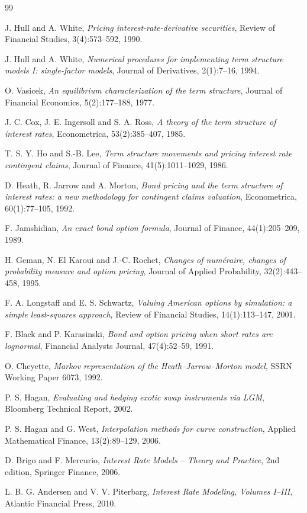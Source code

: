 \documentclass[11pt,a4paper]{article}
\theoremstyle{plain}
\theoremstyle{definition}
\begin{document}
\begin{thebibliography}{99}

J. Hull and A. White,
\textit{Pricing interest-rate-derivative securities},
Review of Financial Studies, 3(4):573--592, 1990.

J. Hull and A. White,
\textit{Numerical procedures for implementing term structure models I: single-factor models},
Journal of Derivatives, 2(1):7--16, 1994.

O. Vasicek,
\textit{An equilibrium characterization of the term structure},
Journal of Financial Economics, 5(2):177--188, 1977.

J. C. Cox, J. E. Ingersoll and S. A. Ross,
\textit{A theory of the term structure of interest rates},
Econometrica, 53(2):385--407, 1985.

T. S. Y. Ho and S.-B. Lee,
\textit{Term structure movements and pricing interest rate contingent claims},
Journal of Finance, 41(5):1011--1029, 1986.

D. Heath, R. Jarrow and A. Morton,
\textit{Bond pricing and the term structure of interest rates: a new methodology for contingent claims valuation},
Econometrica, 60(1):77--105, 1992.

F. Jamshidian,
\textit{An exact bond option formula},
Journal of Finance, 44(1):205--209, 1989.

H. Geman, N. El Karoui and J.-C. Rochet,
\textit{Changes of numéraire, changes of probability measure and option pricing},
Journal of Applied Probability, 32(2):443--458, 1995.

F. A. Longstaff and E. S. Schwartz,
\textit{Valuing American options by simulation: a simple least-squares approach},
Review of Financial Studies, 14(1):113--147, 2001.

F. Black and P. Karasinski,
\textit{Bond and option pricing when short rates are lognormal},
Financial Analysts Journal, 47(4):52--59, 1991.

O. Cheyette,
\textit{Markov representation of the Heath--Jarrow--Morton model},
SSRN Working Paper 6073, 1992.

P. S. Hagan,
\textit{Evaluating and hedging exotic swap instruments via LGM},
Bloomberg Technical Report, 2002.

P. S. Hagan and G. West,
\textit{Interpolation methods for curve construction},
Applied Mathematical Finance, 13(2):89--129, 2006.

D. Brigo and F. Mercurio,
\textit{Interest Rate Models -- Theory and Practice},
2nd edition, Springer Finance, 2006.

L. B. G. Andersen and V. V. Piterbarg,
\textit{Interest Rate Modeling, Volumes I--III},
Atlantic Financial Press, 2010.

\end{thebibliography}
\end{document}

